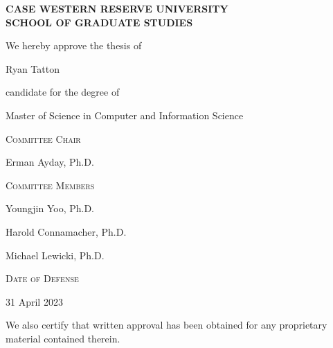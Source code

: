 \begin{center}

\large

\textbf{CASE WESTERN RESERVE UNIVERSITY\\
SCHOOL OF GRADUATE STUDIES}

\vspace{0.2in}

We hereby approve the thesis of

Ryan Tatton

candidate for the degree of 

Master of Science in Computer and Information Science

\vspace{0.2in}

\textsc{Committee Chair}

Erman Ayday, Ph.D.

\vspace{0.2in}

\textsc{Committee Members}

Youngjin Yoo, Ph.D.

Harold Connamacher, Ph.D.

Michael Lewicki, Ph.D.

\vspace{0.2in}

\textsc{Date of Defense}

31 April 2023

\vspace{0.2in}

We also certify that written approval has been obtained for any proprietary
material contained therein.

\end{center}